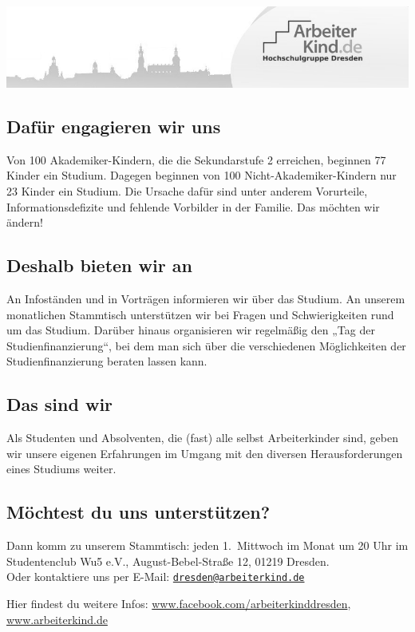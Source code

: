 \includegraphics[width=\textwidth]{arbeiterkindlogo-gray.jpg}
\subsection*{Dafür engagieren wir uns}
Von 100 Akademiker-Kindern, die die Sekundarstufe 2 erreichen,
beginnen 77 Kinder ein Studium.
Dagegen beginnen von 100 Nicht-Akademiker-Kindern nur 23 Kinder ein Studium.
Die Ursache dafür sind unter anderem Vorurteile, Informationsdefizite und fehlende Vorbilder in der Familie.  
Das möchten wir ändern!

\subsection*{Deshalb bieten wir an}
An Infoständen und in Vorträgen informieren wir über das Studium.
An unserem monatlichen Stammtisch unterstützen wir bei Fragen und Schwierigkeiten rund um das Studium.
Darüber hinaus organisieren wir regelmäßig den
„Tag der Studienfinanzierung“,
bei dem man sich über die verschiedenen Möglichkeiten der Studienfinanzierung beraten lassen kann.

\subsection*{Das sind wir}
Als Studenten und Absolventen, die (fast) alle selbst Arbeiterkinder sind,
geben wir unsere eigenen Erfahrungen im Umgang mit den diversen Herausforderungen eines Studiums weiter. 

\subsection*{Möchtest du uns unterstützen?}
Dann komm zu unserem Stammtisch: jeden 1.\ Mittwoch im Monat um 20 Uhr im Studentenclub Wu5 e.V.,
August-Bebel-Straße 12, 01219 Dresden.\\
Oder kontaktiere uns per E-Mail: \href{mailto:dresden@arbeiterkind.de}{\nolinkurl{dresden@arbeiterkind.de}}

Hier findest du weitere Infos:
\url{www.facebook.com/arbeiterkinddresden},
\url{www.arbeiterkind.de}
